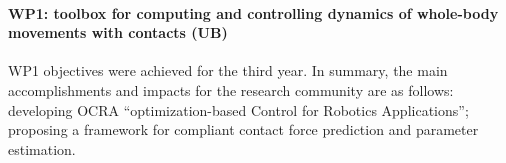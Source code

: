 

\paragraph*{WP1: toolbox for computing and controlling dynamics of whole-body
  movements with contacts (UB)}

WP1 objectives were achieved for the third year.  In summary, the main
accomplishments and impacts for the research community are as follows:
developing OCRA ``optimization-based Control for Robotics Applications'';
proposing a framework for compliant contact force prediction and parameter estimation.

